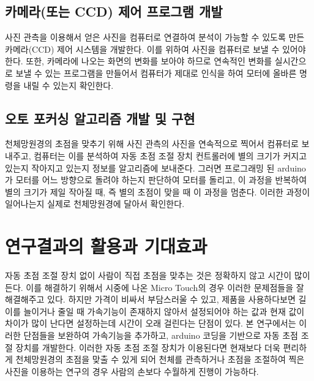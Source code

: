 \documentclass{abstract_hutech}
\begin{document}
\subsection{카메라(또는 CCD) 제어 프로그램 개발}

사진 관측을 이용해서 얻은 사진을 컴퓨터로 연결하여 분석이 가능할 수 있도록 만든 카메라(CCD) 제어 시스템을 개발한다. 이를 위하여 사진을 컴퓨터로 보낼 수 있어야 한다. 또한, 카메라에 나오는 화면의 변화를 보아야 하므로 연속적인 변화를 실시간으로 보낼 수 있는 프로그램을 만들어서 컴퓨터가 제대로 인식을 하여 모터에 올바른 명령을 내릴 수 있는지 확인한다.

\subsection{오토 포커싱 알고리즘 개발 및 구현}

천체망원경의 초점을 맞추기 위해 사진 관측의 사진을 연속적으로 찍어서 컴퓨터로 보내주고, 컴퓨터는 이를 분석하여 자동 초점 조절 장치 컨트롤러에 별의 크기가 커지고 있는지 작아지고 있는지 정보를 알고리즘에 보내준다. 그러면 프로그래밍 된 arduino가 모터를 어느 방향으로 돌려야 하는지 판단하여 모터를 돌리고, 이 과정을 반복하여 별의 크기가 제일 작아질 때, 즉 별의 초점이 맞을 때 이 과정을 멈춘다. 이러한 과정이 일어나는지 실제로 천체망원경에 달아서 확인한다.

\section{연구결과의 활용과 기대효과}

자동 초점 조절 장치 없이 사람이 직접 초점을 맞추는 것은 정확하지 않고 시간이 많이 든다. 이를 해결하기 위해서 시중에 나온 Micro Touch의 경우 이러한 문제점들을 잘 해결해주고 있다. 하지만 가격이 비싸서 부담스러울 수 있고, 제품을 사용하다보면 길이를 늘이거나 줄일 때 가속기능이 존재하지 않아서 설정되어야 하는 값과 현재 값이 차이가 많이 난다면 설정하는데 시간이 오래 걸린다는 단점이 있다. 본 연구에서는 이러한 단점들을 보완하여 가속기능을 추가하고, arduino 코딩을 기반으로 자동 초점 조절 장치를 개발한다. 이러한 자동 초점 조절 장치가 이용된다면 현재보다 더욱 편리하게 천체망원경의 초점을 맞출 수 있게 되어 천체를 관측하거나 초점을 조절하여 찍은 사진을 이용하는 연구의 경우 사람의 손보다 수월하게 진행이 가능하다.

\end{document}
